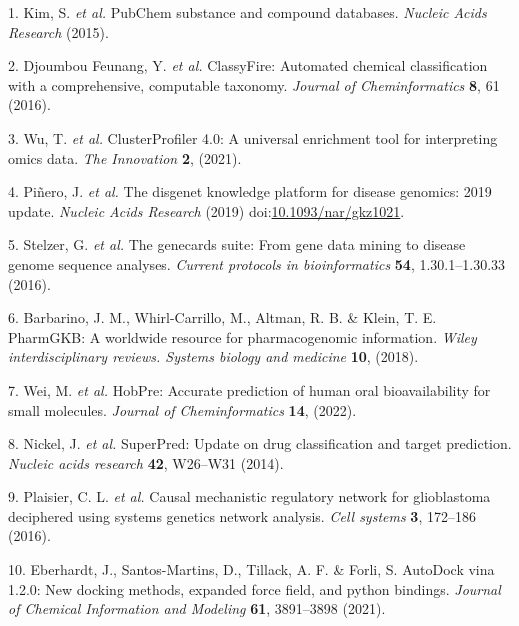 \documentclass[
]{article}
\newenvironment{cslreferences}%
  {}%
  {\par}
\begin{document}
\hypertarget{refs}{}
\begin{cslreferences}
\leavevmode\hypertarget{ref-PubchemSubstanKimS2015}{}%
1. Kim, S. \emph{et al.} PubChem substance and compound databases. \emph{Nucleic Acids Research} (2015).

\leavevmode\hypertarget{ref-ClassyfireAutDjoumb2016}{}%
2. Djoumbou Feunang, Y. \emph{et al.} ClassyFire: Automated chemical classification with a comprehensive, computable taxonomy. \emph{Journal of Cheminformatics} \textbf{8}, 61 (2016).

\leavevmode\hypertarget{ref-ClusterprofilerWuTi2021}{}%
3. Wu, T. \emph{et al.} ClusterProfiler 4.0: A universal enrichment tool for interpreting omics data. \emph{The Innovation} \textbf{2}, (2021).

\leavevmode\hypertarget{ref-TheDisgenetKnPinero2019}{}%
4. Piñero, J. \emph{et al.} The disgenet knowledge platform for disease genomics: 2019 update. \emph{Nucleic Acids Research} (2019) doi:\href{https://doi.org/10.1093/nar/gkz1021}{10.1093/nar/gkz1021}.

\leavevmode\hypertarget{ref-TheGenecardsSStelze2016}{}%
5. Stelzer, G. \emph{et al.} The genecards suite: From gene data mining to disease genome sequence analyses. \emph{Current protocols in bioinformatics} \textbf{54}, 1.30.1--1.30.33 (2016).

\leavevmode\hypertarget{ref-PharmgkbAWorBarbar2018}{}%
6. Barbarino, J. M., Whirl-Carrillo, M., Altman, R. B. \& Klein, T. E. PharmGKB: A worldwide resource for pharmacogenomic information. \emph{Wiley interdisciplinary reviews. Systems biology and medicine} \textbf{10}, (2018).

\leavevmode\hypertarget{ref-HobpreAccuratWeiM2022}{}%
7. Wei, M. \emph{et al.} HobPre: Accurate prediction of human oral bioavailability for small molecules. \emph{Journal of Cheminformatics} \textbf{14}, (2022).

\leavevmode\hypertarget{ref-SuperpredUpdaNickel2014}{}%
8. Nickel, J. \emph{et al.} SuperPred: Update on drug classification and target prediction. \emph{Nucleic acids research} \textbf{42}, W26--W31 (2014).

\leavevmode\hypertarget{ref-CausalMechanisPlaisi2016}{}%
9. Plaisier, C. L. \emph{et al.} Causal mechanistic regulatory network for glioblastoma deciphered using systems genetics network analysis. \emph{Cell systems} \textbf{3}, 172--186 (2016).

\leavevmode\hypertarget{ref-AutodockVina1Eberha2021}{}%
10. Eberhardt, J., Santos-Martins, D., Tillack, A. F. \& Forli, S. AutoDock vina 1.2.0: New docking methods, expanded force field, and python bindings. \emph{Journal of Chemical Information and Modeling} \textbf{61}, 3891--3898 (2021).


\end{cslreferences}
\end{document}
